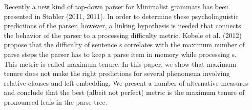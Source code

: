 Recently a new kind of top-down parser for Minimalist grammars has been presented in Stabler (2011, 2011). In order to determine these psycholinguistic predictions of the parser, however, a linking hypothesis is needed that connects the behavior of the parser to a processing difficulty metric. Kobele et al. (2012) propose that the difficulty of sentence s correlates with the maximum number of parse steps the parser has to keep a parse item in memory while processing s. This metric is called maximum tenure. In this paper, we show that maximum tenure does not make the right predictions for several phenomena involving relative clauses and left embedding. We present a number of alternative measures and conclude that the best (albeit not perfect) metric is the maximum tenure of pronounced leafs in the parse tree.
